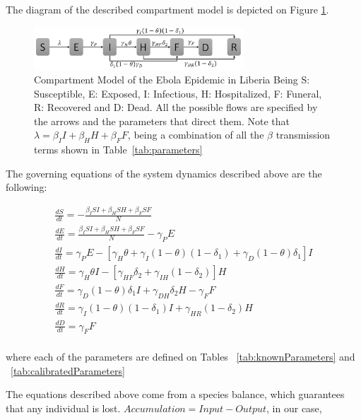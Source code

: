 The diagram of the described compartment model is depicted on Figure \ref{fig:compartment}. \\


\begin{figure}[!h]
  \centering
  \includegraphics[width=0.7\textwidth]{compartment}
  \caption{Compartment Model of the Ebola Epidemic in Liberia  \newline  Being S: Susceptible, E: Exposed, I: Infectious, H: Hospitalized, F: Funeral,  R: Recovered and D: Dead. All the possible flows are specified by the arrows and the parameters that direct them. Note that $\lambda = \beta_{I}I+\beta_{H}H+\beta_{F}F $, being a combination of all the $\beta$ transmission terms shown in Table~\ref{tab:parameters}} 
\label{fig:compartment} 
\end{figure}


The governing equations of the system dynamics described above are the following:

\begin{eqnarray} 
\label{SDeqn}
\frac{dS}{dt} = - \frac{\beta_{I}SI+\beta_{H}SH+\beta_{F}SF}{N} \label{eqn:SD1}\\
\frac{dE}{dt} =  \frac{\beta_{I}SI+\beta_{H}SH+\beta_{F}SF}{N}-\gamma_P E         \label{eqn:SD2}\\
\frac{dI}{dt} =  \gamma_P E - [\gamma_{H}\theta + \gamma_{I}(1-\theta)(1-\delta_{1})+\gamma_{D}(1-\theta)\delta_{1}]I   \label{eqn:SD3}\\
\frac{dH}{dt} = \gamma_{H}\theta I - [\gamma_{HF}\delta_{2}+\gamma_{IH}(1-\delta_{2})]H \label{eqn:SD4}\\
\frac{dF}{dt} = \gamma_{D}(1-\theta) \delta_{1} I + \gamma_{DH}\delta_{2} H-\gamma_{F} F     \label{eqn:SD5}\\
\frac{dR}{dt} = \gamma_{I}(1-\theta)(1- \delta_{1}) I + \gamma_{HR}(1-\delta_{2}) H       \label{eqn:SD6}\\
\frac{dD}{dt} = \gamma_{F} F     \label{eqn:SD7}
\end{eqnarray}\\

where each of the parameters are defined on Tables ~\ref{tab:knownParameters} and ~\ref{tab:calibratedParameters}



\noindent The equations described above come from a species balance, which guarantees that any individual is lost. $Accumulation = Input - Output$, in our case,

